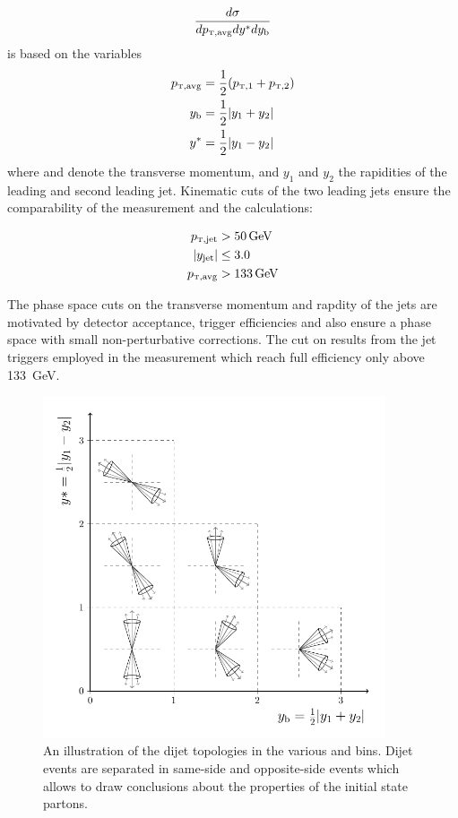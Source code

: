 \begin{equation*}
    \frac{d \sigma}{d \ptavg d\ystar d \yboost}
\end{equation*}
%
is based on the variables
%
\begin{align*}
\ptavg &=\frac{1}{2}(\ptone + \pttwo)\\
\yboost& =\frac{1}{2}|y_1 + y_2|\\
\ystar &=\frac{1}{2}|y_1 - y_2|
\end{align*}
%
where \ptone and \pttwo denote the transverse momentum, and $y_1$ and $y_2$ the
rapidities of the leading and second leading jet. Kinematic cuts of the two
leading jets ensure the comparability of the measurement and the calculations:

\begin{align*}
    \ptjet &> \SI{50}{\GeV}\\
    |y_\mathrm{jet}| &\leq 3.0\\
    \ptavg &> \SI{133}{\GeV}
\end{align*}

The phase space cuts on the transverse momentum and rapdity of the jets are
motivated by detector acceptance, trigger efficiencies and also ensure a phase
space with small non-perturbative corrections. The cut on \ptavg results from
the jet triggers employed in the measurement which reach full efficiency only
above \SI{133}{\GeV}.

\begin{figure}[h!tbp]
    \centering
    \includegraphics[width=0.9\textwidth]{figures/drawings/ybys.pdf}
    \caption[Dijet topologies in \ystar and \yboost phase space]
        {An illustration of the dijet topologies in the various \ystar and
        \yboost bins. Dijet events are separated in same-side and opposite-side
        events which allows to draw conclusions about the properties of the
    initial state partons.}
    \label{fig:ysyb_schema}
\end{figure}

